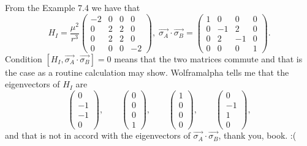 \documentclass[10pt]{article}
\begin{document}
From the Example 7.4 we have that
\[
H_I = 
\frac{\mu^2}{r^3}
\begin{pmatrix}
-2 & 0 & 0 & 0 \\
0 & 2 & 2 & 0 \\
0 & 2 & 2 & 0 \\
0 & 0 & 0 & -2
\end{pmatrix},
\;
\vec{\sigma_A} \cdot \vec{\sigma_B} = 
\begin{pmatrix}
1 & 0 & 0 & 0 \\
0 & -1 & 2 & 0 \\
0 & 2 & -1 & 0 \\
0 & 0 & 0 & 1
\end{pmatrix}.
\]
Condition $[H_I, \vec{\sigma_A} \cdot \vec{\sigma_B}] = 0$ means that the two matrices commute and that is the case as a routine calculation may show. Wolframalpha tells me that the eigenvectors of $H_I$ are
\[
\begin{pmatrix}
0 \\
-1 \\
-1 \\
0
\end{pmatrix}, \qquad
\begin{pmatrix}
0 \\
0 \\
0 \\
1
\end{pmatrix}, \qquad
\begin{pmatrix}
1 \\
0 \\
0 \\
0
\end{pmatrix}, \qquad
\begin{pmatrix}
0 \\
-1 \\
1 \\
0
\end{pmatrix},
\]
and that is not in accord with the eigenvectors of $\vec{\sigma_A} \cdot \vec{\sigma_B}$, thank you, book. :(
\end{document}
